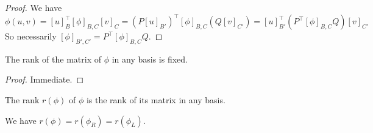 \begin{proof}
    We have
    $$\phi(u,v)=[u]_B^\top[\phi]_{B,C}[v]_C=(P[u]_{B'})^\top [\phi]_{B,C}(Q[v]_{C'})=[u]_{B'}^\top (P^\top[\phi]_{B,C}Q)[v]_{C'}$$
    So necessarily $[\phi]_{B',C'}=P^\top[\phi]_{B,C}Q$.
\end{proof}
\begin{lemma}
    The rank of the matrix of $\phi$ in any basis is fixed.
\end{lemma}
\begin{proof}
    Immediate.
\end{proof}
\begin{definition}
    The rank $r(\phi)$ of $\phi$ is the rank of its matrix in any basis.
\end{definition}
\begin{remark}
    We have $r(\phi)=r(\phi_R)=r(\phi_L)$.
\end{remark}